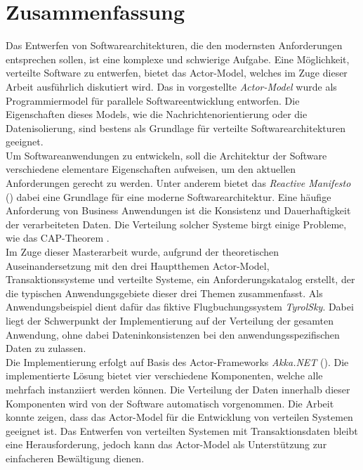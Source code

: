 \chapter*{Zusammenfassung}
Das Entwerfen von Softwarearchitekturen, die den modernsten Anforderungen entsprechen sollen, ist eine komplexe und schwierige Aufgabe. Eine Möglichkeit, verteilte Software zu entwerfen, bietet das Actor-Model, welches im Zuge dieser Arbeit ausführlich diskutiert wird. Das in \cite{Hewitt1973AIntelligence} vorgestellte \textit{Actor-Model} wurde als Programmiermodel für parallele Softwareentwicklung entworfen. Die Eigenschaften dieses Models, wie die Nachrichtenorientierung oder die Datenisolierung, sind bestens als Grundlage für verteilte Softwarearchitekturen geeignet. \\
Um Softwareanwendungen zu entwickeln, soll die Architektur der Software verschiedene elementare Eigenschaften aufweisen, um den aktuellen Anforderungen gerecht zu werden. Unter anderem bietet das \textit{Reactive Manifesto} (\cite{reactiveManifesto}) dabei eine Grundlage für eine moderne Softwarearchitektur. 
Eine häufige Anforderung von Business Anwendungen ist die Konsistenz und Dauerhaftigkeit der verarbeiteten Daten. Die Verteilung solcher Systeme birgt einige Probleme, wie das CAP-Theorem \citep{gilbertPerspectiveCAPTheorem2012}. \\
Im Zuge dieser Masterarbeit wurde, aufgrund der theoretischen Auseinandersetzung mit den drei Hauptthemen  Actor-Model, Transaktionssysteme und verteilte Systeme, ein Anforderungskatalog erstellt, der die typischen Anwendungsgebiete dieser drei Themen zusammenfasst. Als Anwendungsbeispiel dient dafür das fiktive Flugbuchungssystem \textit{TyrolSky}. Dabei liegt der Schwerpunkt der Implementierung auf der Verteilung der gesamten Anwendung, ohne dabei Dateninkonsistenzen bei den anwendungsspezifischen Daten zu zulassen. \\
Die Implementierung erfolgt auf Basis des Actor-Frameworks \textit{Akka.NET} (\cite{Akka.NETCommunityAkka.NETDocumentation}). Die implementierte Lösung bietet vier verschiedene Komponenten, welche alle mehrfach instanziiert werden können. Die Verteilung der Daten innerhalb dieser Komponenten wird von der Software automatisch vorgenommen.
Die Arbeit konnte zeigen, dass das Actor-Model für die Entwicklung von verteilen Systemen geeignet ist. Das Entwerfen von verteilten Systemen mit Transaktionsdaten bleibt eine Herausforderung, jedoch kann das Actor-Model als Unterstützung zur einfacheren Bewältigung dienen.

\cleardoublepage
